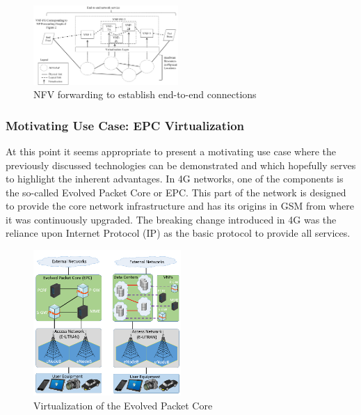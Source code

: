 \begin{figure}[H]
	\centering
	\includegraphics[width=0.49\textwidth]{images/nfv_forwarding.png}
	\caption{NFV forwarding to establish end-to-end connections \cite{ etsi1etsi}}
	\label{img:nfv_forward}
\end{figure}

\subsubsection{Motivating Use Case: EPC Virtualization}
At this point it seems appropriate to present a motivating use case where the previously discussed technologies can be demonstrated and which hopefully serves to highlight the inherent advantages. In 4G networks, one of the components is the so-called Evolved Packet Core or EPC. This part of the network is designed to provide the core network infrastructure and has its origins in GSM from where it was continuously upgraded. The breaking change introduced in 4G was the reliance upon Internet Protocol (IP) as the basic protocol to provide all services. 

\begin{figure}[H]
	\centering
	\includegraphics[width=0.5\textwidth]{images/epc_virt.png}
	\caption{Virtualization of the Evolved Packet Core \cite{mijumbi2016network}}
	\label{img:epc_virt}
\end{figure}

